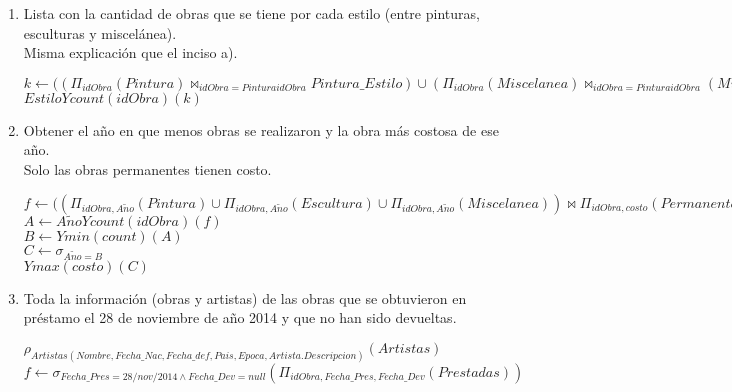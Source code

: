 \documentclass{article}
\begin{document}
\begin{enumerate}
\begin{enumerate}
					$j \leftarrow ((\Pi_{idObra, ArtistasNombre}(Pintura)\bowtie_{ArtistasNombre=Nombre})\Pi_{Nombre}(Artista)) \cup (\Pi_{idObra, ArtistasNombre}(Escultura)\bowtie_{ArtistasNombre=Nombre}\Pi_{Nombre}(Artista)) \cup (\Pi_{idObra, ArtistasNombre}(Miscelanea) \bowtie_{ArtistasNombre=Nombre} \Pi_{Nombre}(Artista))$\\
					
					$Nombre Y count(idObra)(j)$
						
				\item Lista con la cantidad de obras que se tiene por cada estilo (entre pinturas, esculturas y
				miscelánea).\\
														
				Misma explicación que el inciso a).
				
				$k \leftarrow ((\Pi_{idObra}(Pintura) \bowtie_{idObra=PinturaidObra} Pintura\_Estilo) \cup (\Pi_{idObra}(Miscelanea) \bowtie_{idObra=PinturaidObra} (Miscelanea\_Estilo))$\\
				
				$EstiloYcount(idObra)(k)$
										
				\item Obtener el año en que menos obras se realizaron y la obra más costosa de ese año.\\
				
				Solo las obras permanentes tienen costo.
				
				$f \leftarrow ((\Pi_{idObra, A\tilde{n}o}(Pintura) \cup \Pi_{idObra, A\tilde{n}o}(Escultura) \cup \Pi_{idObra, A\tilde{n}o}(Miscelanea)) \bowtie \Pi_{idObra, costo}(Permanentes)$\\
				
				$A \leftarrow A\tilde{n}oYcount(idObra)(f)$\\
				$B \leftarrow Ymin(count)(A)$\\
				$C \leftarrow \sigma_{A\tilde{n}o = B}$\\
				$Ymax(costo)(C)$\\
				
				\item Toda la información (obras y artistas) de las obras que se obtuvieron en préstamo el 28 de
				noviembre de año 2014 y que no han sido devueltas.
				
				$\rho_{Artistas(Nombre, Fecha\_Nac, Fecha\_def, Pais, Epoca, Artista.Descripcion)}(Artistas)$			
				$f \leftarrow \sigma_{Fecha\_Pres = 28/nov/2014 \land Fecha\_Dev = null}(\Pi_{idObra, Fecha\_Pres, Fecha\_Dev}(Prestadas))$
				

\end{enumerate}
\end{enumerate}
\end{document}
